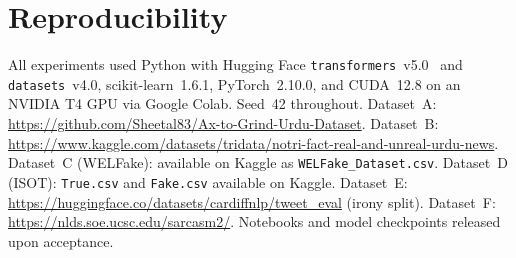 \documentclass[conference]{IEEEtran}
\begin{document}
\section*{Reproducibility}

All experiments used Python with Hugging Face
\texttt{transformers}~v5.0~\cite{wolf2020transformers} and
\texttt{datasets}~v4.0, scikit-learn~1.6.1, PyTorch~2.10.0, and
CUDA~12.8 on an NVIDIA T4 GPU via Google Colab. Seed~42 throughout.
Dataset~A: \url{https://github.com/Sheetal83/Ax-to-Grind-Urdu-Dataset}.
Dataset~B: \url{https://www.kaggle.com/datasets/tridata/notri-fact-real-and-unreal-urdu-news}.
Dataset~C (WELFake): available on Kaggle as \texttt{WELFake\_Dataset.csv}.
Dataset~D (ISOT): \texttt{True.csv} and \texttt{Fake.csv} available on Kaggle.
Dataset~E: \url{https://huggingface.co/datasets/cardiffnlp/tweet_eval} (irony split).
Dataset~F: \url{https://nlds.soe.ucsc.edu/sarcasm2/}.
Notebooks and model checkpoints released upon acceptance.
\end{document}

